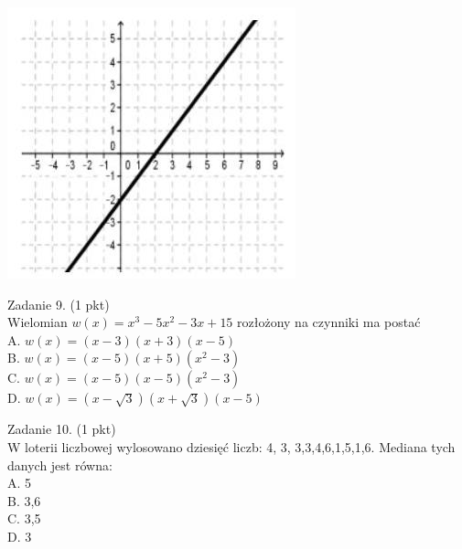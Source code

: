 \documentclass[10pt]{article}
\begin{document}
\includegraphics[max width=\textwidth, center]{2024_11_21_9a9f600c3b3af5013d80g-04}

Zadanie 9. (1 pkt)\\
Wielomian \(w(x)=x^{3}-5 x^{2}-3 x+15\) rozłożony na czynniki ma postać\\
A. \(w(x)=(x-3)(x+3)(x-5)\)\\
B. \(w(x)=(x-5)(x+5)\left(x^{2}-3\right)\)\\
C. \(w(x)=(x-5)(x-5)\left(x^{2}-3\right)\)\\
D. \(w(x)=(x-\sqrt{3})(x+\sqrt{3})(x-5)\)

Zadanie 10. (1 pkt)\\
W loterii liczbowej wylosowano dziesięć liczb: 4, 3, 3,3,4,6,1,5,1,6. Mediana tych danych jest równa:\\
A. 5\\
B. 3,6\\
C. 3,5\\
D. 3
\end{document}
